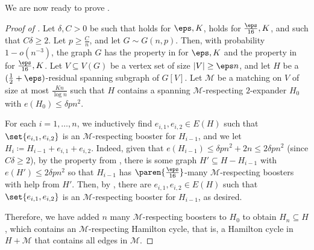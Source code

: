 \documentclass[10pt,a4paper,reqno]{amsart}
\begin{document}
We are now ready to prove .

\begin{proof}[Proof of ]
Let $\delta, C > 0$ be such that  holds for $\eps, K$,  holds for $\frac{\eps}{16}, K$, and such that $C \delta \geq 2$. Let $p \geq \frac{C}{n}$, and let $G \sim G(n, p)$. Then, with probability $1-o(n^{-3})$, the graph $G$ has the property in  for $\eps, K$ and the property in  for $\frac{\eps}{16},K$. Let $V \subseteq V(G)$ be a vertex set of size $|V| \geq \eps n$, and let $H$ be a $(\frac{1}{2} + \eps)$-residual spanning subgraph of $G[V]$. Let $\mathcal{M}$ be a matching on $V$ of size at most $\frac{K n}{\log{n}}$ such that $H$ contains a spanning $\mathcal{M}$-respecting $2$-expander $H_0$ with $e(H_0) \leq \delta p n^2$.

For each $i = 1,\ldots,n$, we inductively find $e_{i, 1}, e_{i, 2} \in E(H)$ such that $\set{e_{i, 1}, e_{i, 2}}$ is an $\mathcal{M}$-respecting booster for $H_{i - 1}$, and we let $H_i \coloneqq H_{i - 1} + e_{i, 1} + e_{i, 2}$. Indeed, given that $e(H_{i - 1}) \leq \delta p n^2 + 2n \leq 2\delta p n^2$ (since $C\delta \ge 2$), by the property from , there is some graph $H' \subseteq H - H_{i - 1}$ with $e(H') \leq 2\delta pn^2$ so that $H_{i - 1}$ has $\paren{\frac{\eps}{16}}$-many $\mathcal{M}$-respecting boosters with help from $H'$. Then, by , there are $e_{i, 1}, e_{i, 2} \in E(H)$ such that $\set{e_{i, 1}, e_{i, 2}}$ is an $\mathcal{M}$-respecting booster for $H_{i - 1}$, as desired.

Therefore, we have added $n$ many $\mathcal{M}$-respecting boosters to $H_0$ to obtain $H_n \subseteq H$, which contains an $\mathcal{M}$-respecting Hamilton cycle, that is, a Hamilton cycle in $H + \mathcal{M}$ that contains all edges in $\mathcal{M}$.
\end{proof}
\end{document}
